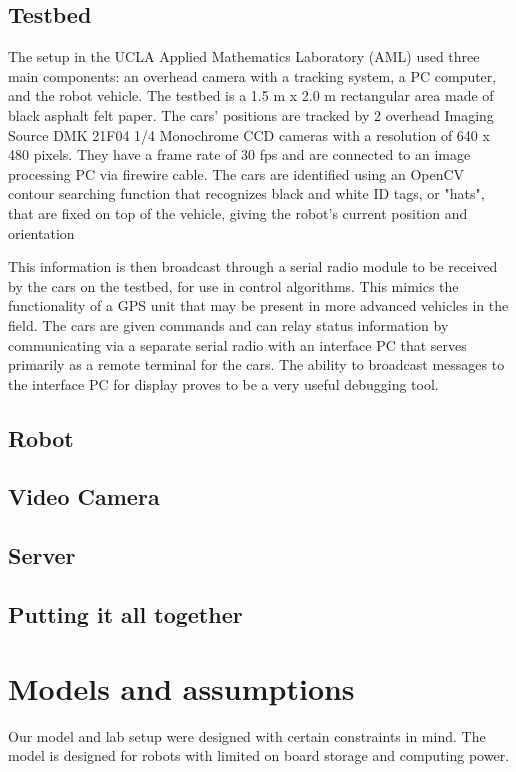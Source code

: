 \documentclass[english]{article}\usepackage[]{graphicx}\usepackage[]{color}
\begin{document}
\subsection{Testbed}
The setup in the UCLA Applied Mathematics Laboratory (AML) used three main components: an overhead camera with a tracking system, a PC computer, and the robot vehicle. The testbed is a 1.5 m x 2.0 m rectangular area made of black asphalt felt paper. The cars' positions are tracked by 2 overhead Imaging Source DMK 21F04 1/4 Monochrome CCD cameras with a resolution of 640 x 480 pixels. They have a frame rate of 30 fps and are connected to an image processing PC via firewire cable. The cars are identified using an OpenCV contour searching function that recognizes black and white ID tags, or "hats", that are fixed on top of the vehicle, giving the robot's current position and orientation \cite{gonzalez2011third}

This information is then broadcast through a serial radio module to be received by the cars on the testbed, for use in control algorithms. This mimics the functionality of a GPS unit that may be present in more advanced vehicles in the field.
The cars are given commands and can relay status information by communicating via a separate serial radio with an interface PC that serves primarily as a remote terminal for the cars. The ability to broadcast messages to the interface PC for display proves to be a very useful debugging tool.
\subsection{Robot}
\subsection{Video Camera}
\subsection{Server}
\subsection{Putting it all together}

\section{Models and assumptions}
Our model and lab setup were designed with certain constraints in mind. The model is designed for robots with limited on board storage and computing power. 
\end{document}
